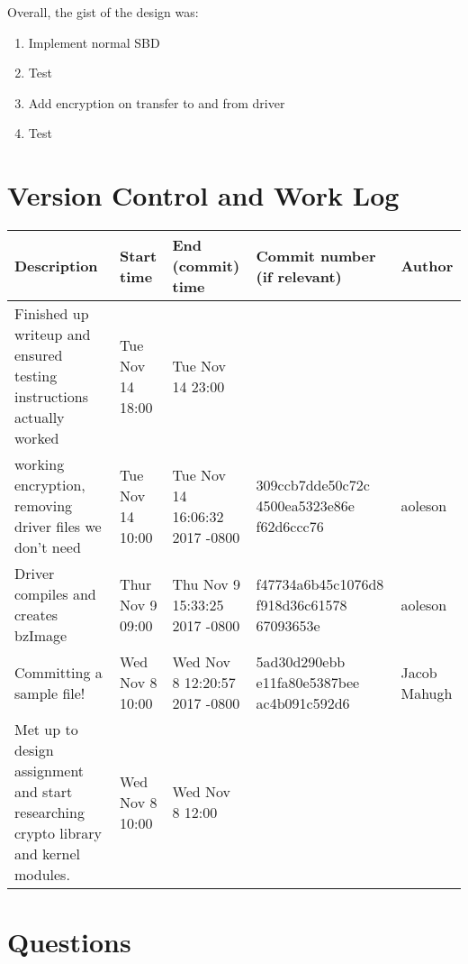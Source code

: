 \documentclass[letterpaper,10pt,titlepage]{article}
\begin{document}
Overall, the gist of the design was:
\begin{enumerate}
    \item Implement normal SBD
    \item Test
    \item Add encryption on transfer to and from driver
    \item Test
\end{enumerate}	

\section{Version Control and Work Log}

\begin{table}[H]
\centering
\begin{tabular}{|p{3cm}|p{2cm}|p{2cm}|p{3cm}|p{2cm}|}
\hline
Description                                                                                           & Start time       & End (commit) time              & Commit number (if relevant)              & Author       \\
\hline
Finished up writeup and ensured testing instructions actually worked                 & Tue Nov 14 18:00 & Tue Nov 14 23:00               &                                          &             	 \\
\hline
working encryption, removing driver files we don't need                                              & Tue Nov 14 10:00	& Tue Nov 14 16:06:32 2017 -0800 & 309ccb7dde50c72c 4500ea5323e86e f62d6ccc76 & aoleson      \\
\hline
Driver compiles and creates bzImage                                                                & Thur Nov 9 09:00	& Thu Nov 9 15:33:25 2017 -0800 & f47734a6b45c1076d8 f918d36c61578 67093653e & aoleson \\
\hline
Committing a sample file! & Wed Nov 8 10:00 & Wed Nov 8 12:20:57 2017 -0800 & 5ad30d290ebb e11fa80e5387bee ac4b091c592d6 & Jacob Mahugh \\
\hline
Met up to design assignment and start researching crypto library and kernel modules.                 & Wed Nov 8 10:00 & Wed Nov 8 12:00               &                                          &             	 \\
\hline
\end{tabular}
\end{table}

\section{Questions}
\end{document}
